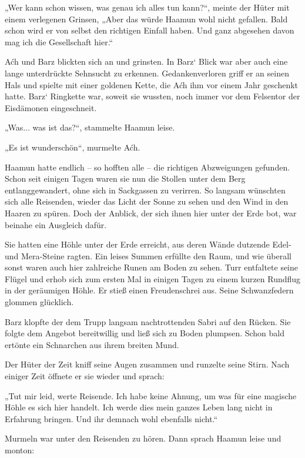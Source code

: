 „Wer kann schon wissen, was genau ich alles tun kann?“, meinte der Hüter mit einem verlegenen Grinsen, „Aber das würde Haamun wohl nicht gefallen. Bald schon wird er von selbst den richtigen Einfall haben. Und ganz abgesehen davon mag ich die Gesellschaft hier.“

Aćh und Barz blickten sich an und grinsten. In Barz‘ Blick war aber auch eine lange unterdrückte Sehnsucht zu erkennen. Gedankenverloren griff er an seinen Hals und spielte mit einer goldenen Kette, die Aćh ihm vor einem Jahr geschenkt hatte. Barz‘ Ringkette war, soweit sie wussten, noch immer vor dem Felsentor der Eisdämonen eingeschneit.



\trennzeichen



„Was... was ist das?“, stammelte Haamun leise.

„Es ist wunderschön“, murmelte Aćh.

Haamun hatte endlich – so hofften alle – die richtigen Abzweigungen gefunden. Schon seit einigen Tagen waren sie nun die Stollen unter dem Berg entlanggewandert, ohne sich in Sackgassen zu verirren. So langsam wünschten sich alle Reisenden, wieder das Licht der Sonne zu sehen und den Wind in den Haaren zu spüren. Doch der Anblick, der sich ihnen hier unter der Erde bot, war beinahe ein Ausgleich dafür.

Sie hatten eine Höhle unter der Erde erreicht, aus deren Wände dutzende Edel- und Mera-Steine ragten. Ein leises Summen erfüllte den Raum, und wie überall sonst waren auch hier zahlreiche Runen am Boden zu sehen. Turr entfaltete seine Flügel und erhob sich zum ersten Mal in einigen Tagen zu einem kurzen Rundflug in der geräumigen Höhle. Er stieß einen Freudenschrei aus. Seine Schwanzfedern glommen glücklich.

Barz klopfte der dem Trupp langsam nachtrottenden Sabri auf den Rücken. Sie folgte dem Angebot bereitwillig und ließ sich zu Boden plumpsen. Schon bald ertönte ein Schnarchen aus ihrem breiten Mund.

Der Hüter der Zeit kniff seine Augen zusammen und runzelte seine Stirn. Nach einiger Zeit öffnete er sie wieder und sprach:

„Tut mir leid, werte Reisende. Ich habe keine Ahnung, um was für eine magische Höhle es sich hier handelt. Ich werde dies mein ganzes Leben lang nicht in Erfahrung bringen. Und ihr demnach wohl ebenfalls nicht.“

Murmeln war unter den Reisenden zu hören. Dann sprach Haamun leise und monton:

